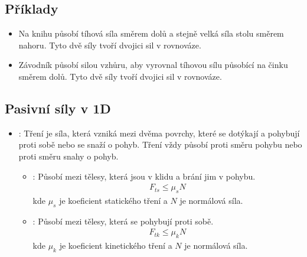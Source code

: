 \documentclass[letterpaper,10pt,english]{jupyterBook}
\begin{document}
\subsection{Příklady}
\label{\detokenize{Prednasky/1_3_Dynamika_pohybu_v_1D:priklady}}\begin{itemize}
\item {} 
\sphinxAtStartPar
{} Na knihu působí tíhová síla směrem dolů a stejně velká síla stolu směrem nahoru. Tyto dvě síly tvoří dvojici sil v rovnováze.

\item {} 
\sphinxAtStartPar
{} Závodník působí silou vzhůru, aby vyrovnal tíhovou sílu působící na činku směrem dolů. Tyto dvě síly tvoří dvojici sil v rovnováze.

\end{itemize}

\sphinxAtStartPar
{}


\subsection{Pasivní síly v 1D}
\label{\detokenize{Prednasky/1_3_Dynamika_pohybu_v_1D:pasivni-sily-v-1d}}\begin{itemize}
\item {} 
\sphinxAtStartPar
{}: Tření je síla, která vzniká mezi dvěma povrchy, které se dotýkají a pohybují proti sobě nebo se snaží o pohyb. Tření vždy působí proti směru pohybu nebo proti směru snahy o pohyb.
\begin{itemize}
\item {} 
\sphinxAtStartPar
{}: Působí mezi tělesy, která jsou v klidu a brání jim v pohybu.
\begin{equation*}
\begin{split} F_{ts} \leq \mu_s N\end{split}
\end{equation*}
\sphinxAtStartPar
kde \(\mu_s\) je koeficient statického tření a \(N\) je normálová síla.

\item {} 
\sphinxAtStartPar
{}: Působí mezi tělesy, která se pohybují proti sobě.
\begin{equation*}
\begin{split} F_{tk} \leq \mu_k N\end{split}
\end{equation*}
\sphinxAtStartPar
kde \(\mu_k\) je koeficient kinetického tření a \(N\) je normálová síla.

\end{itemize}

\end{itemize}
\end{document}
